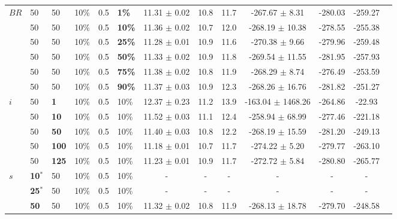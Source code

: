 \begin{sidewaystable}
\begin{tabular}{|l|l|l|l|l|l||c|c|c|c|c|c|c|}
    \hline
    $BR$ & 50 & 50 & 10\% & 0.5 & \textbf{1\%} & 11.31 $\pm$ 0.02 & 10.8 & 11.7 & -267.67 $\pm$ 8.31 & -280.03 & -259.27 \\
    ~    & 50 & 50 & 10\% & 0.5 & \textbf{10\%} & 11.36 $\pm$ 0.02 & 10.7 & 12.0 & -268.19 $\pm$ 10.38 & -278.55 & -255.38 \\
    ~    & 50 & 50 & 10\% & 0.5 & \textbf{25\%} & 11.28 $\pm$ 0.01 & 10.9 & 11.6 & -270.38 $\pm$ 9.66 & -279.96 & -259.48 \\
    ~    & 50 & 50 & 10\% & 0.5 & \textbf{50\%} & 11.33 $\pm$ 0.02 & 10.9 & 11.8 & -269.54 $\pm$ 11.55 & -281.95 & -257.93 \\
    ~    & 50 & 50 & 10\% & 0.5 & \textbf{75\%} & 11.38 $\pm$ 0.02 & 10.8 & 11.9 & -268.29 $\pm$ 8.74 & -276.49 & -253.59 \\
    ~    & 50 & 50 & 10\% & 0.5 & \textbf{90\%} & 11.37 $\pm$ 0.03 & 10.9 & 12.3 & -268.26 $\pm$ 16.76 & -281.82 & -251.27 \\
    \hline
    $i$ & 50 & \textbf{1} & 10\% & 0.5 & 10\% & 12.37 $\pm$ 0.23 & 11.2 & 13.9& -163.04 $\pm$ 1468.26 & -264.86 & -22.93  \\
    ~   & 50 &\textbf{10} & 10\% & 0.5 & 10\% & 11.52 $\pm$ 0.03 & 11.1 & 12.4 & -258.94 $\pm$ 68.99 & -277.46& -221.18 \\
    ~   & 50 &\textbf{50} & 10\% & 0.5 & 10\% & 11.40 $\pm$ 0.03 & 10.8 & 12.2 & -268.19 $\pm$ 15.59 & -281.20 & -249.13 \\
    ~   & 50 &\textbf{100} & 10\% & 0.5 & 10\% & 11.18 $\pm$ 0.01 & 10.7 & 11.7 & -274.22 $\pm$ 5.20 & -279.77 & -263.10 \\
    ~   & 50 &\textbf{125} & 10\% & 0.5 & 10\% & 11.23 $\pm$ 0.01 & 10.9 & 11.7 & -272.72 $\pm$ 5.84 & -280.80 & -265.77  \\
    \hline
    $s$ & \textbf{10$^*$} & 50 & 10\% & 0.5 & 10\% & - & - & - & - & -& - \\
    ~ & \textbf{25$^*$} & 50 & 10\% & 0.5 & 10\% & - & - & - & - & - & -  \\
    ~ & \textbf{50} & 50 & 10\% & 0.5 & 10\% & 11.32 $\pm$ 0.02 & 10.8 & 11.9 & -268.13 $\pm$ 18.78 & -279.70 & -248.58\\

\end{tabular}
\end{sidewaystable}
